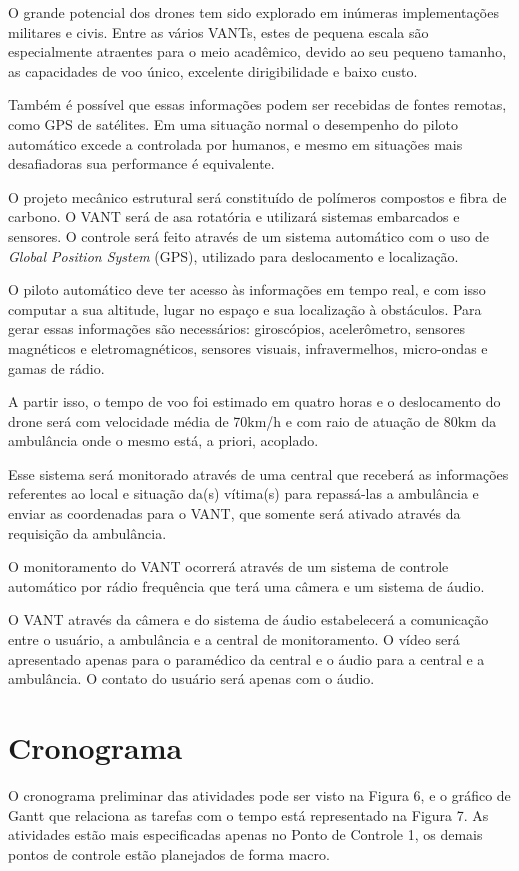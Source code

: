 O grande potencial dos drones tem sido explorado em inúmeras implementações militares e civis. Entre as vários VANTs, estes de pequena escala são especialmente atraentes para o meio acadêmico, devido ao seu pequeno tamanho, as capacidades de voo único, excelente dirigibilidade e baixo custo.\cite{SDM}

Também é possível que essas informações podem ser recebidas de fontes remotas, como GPS de satélites. Em uma situação normal o desempenho do piloto automático excede a controlada por humanos, e mesmo em situações mais desafiadoras sua performance é equivalente.

O projeto mecânico estrutural será constituído de polímeros compostos e fibra de carbono. O VANT será de asa rotatória e utilizará sistemas embarcados e sensores. O controle será feito através de um sistema automático com o uso de \textit{Global Position System} (GPS), utilizado para deslocamento e localização. 

O piloto automático deve ter acesso às informações em tempo real, e com isso computar a sua altitude, lugar no espaço e sua localização à obstáculos. Para gerar essas informações são necessários: giroscópios, acelerômetro, sensores magnéticos e eletromagnéticos, sensores visuais, infravermelhos, micro-ondas e gamas de rádio.\cite{UDE}

A partir isso, o tempo de voo foi estimado em quatro horas e o deslocamento do drone será com velocidade média de 70km/h e com raio de atuação de 80km da ambulância onde o mesmo está, a priori, acoplado. 

Esse sistema será monitorado através de uma central que receberá as informações referentes ao local e situação da(s) vítima(s) para repassá-las a ambulância e enviar as coordenadas para o VANT, que somente será ativado através da requisição da ambulância. 

O monitoramento do VANT ocorrerá através de um sistema de controle automático por rádio frequência que terá uma câmera e um sistema de áudio. 

O VANT através da câmera e do sistema de áudio estabelecerá a comunicação entre o usuário, a ambulância e a central de monitoramento. O vídeo será apresentado apenas para o paramédico da central e o áudio para a central e a ambulância. O contato do usuário será apenas com o áudio.

\section{Cronograma}
O cronograma preliminar das atividades pode ser visto na Figura 6, e o gráfico de Gantt que relaciona as tarefas com o tempo está representado na Figura 7. As atividades estão mais especificadas apenas no Ponto de Controle 1, os demais pontos de controle estão planejados de forma macro.

